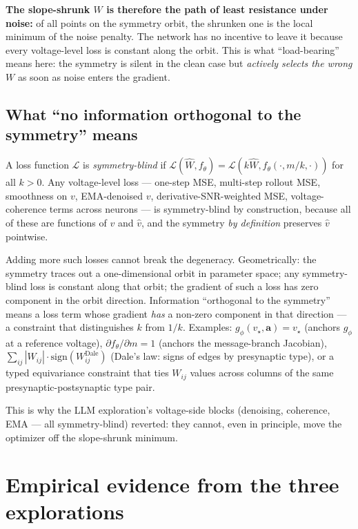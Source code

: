 \documentclass[11pt]{article}
\begin{document}
\textbf{The slope-shrunk $W$ is therefore the path of least resistance
under noise:} of all points on the symmetry orbit, the shrunken one is the
local minimum of the noise penalty. The network has no incentive to leave it
because every voltage-level loss is constant along the orbit. This is what
``load-bearing'' means here: the symmetry is silent in the clean case but
\emph{actively selects the wrong $W$} as soon as noise enters the gradient.

\subsection{What ``no information orthogonal to the symmetry'' means}

A loss function $\mathcal L$ is \emph{symmetry-blind} if
$\mathcal L(\widehat W, f_\theta) = \mathcal L(k\widehat W, f_\theta(\cdot,m/k,\cdot))$
for all $k>0$. Any voltage-level loss --- one-step MSE, multi-step rollout
MSE, smoothness on $v$, EMA-denoised $v$, derivative-SNR-weighted MSE,
voltage-coherence terms across neurons --- is symmetry-blind by construction,
because all of these are functions of $v$ and $\hat v$, and the symmetry
\emph{by definition} preserves $\hat v$ pointwise.

Adding more such losses cannot break the degeneracy. Geometrically: the
symmetry traces out a one-dimensional orbit in parameter space; any
symmetry-blind loss is constant along that orbit; the gradient of such a
loss has zero component in the orbit direction. Information ``orthogonal to
the symmetry'' means a loss term whose gradient \emph{has} a non-zero
component in that direction --- a constraint that distinguishes $k$ from
$1/k$. Examples: $g_\phi(v_\star,\mathbf a) = v_\star$ (anchors $g_\phi$ at a
reference voltage), $\partial f_\theta/\partial m = 1$ (anchors the
message-branch Jacobian), $\sum_{ij}|W_{ij}| \cdot \mathrm{sign}(W^{\text{Dale}}_{ij})$
(Dale's law: signs of edges by presynaptic type), or a typed equivariance
constraint that ties $W_{ij}$ values across columns of the same
presynaptic-postsynaptic type pair.

This is why the LLM exploration's voltage-side blocks (denoising, coherence,
EMA --- all symmetry-blind) reverted: they cannot, even in principle, move
the optimizer off the slope-shrunk minimum.

\section{Empirical evidence from the three explorations}
\end{document}
